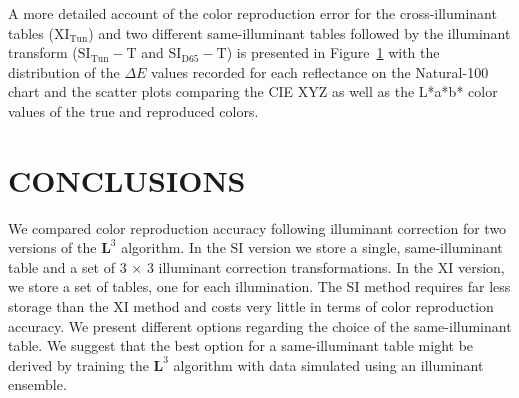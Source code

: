 \documentclass[]{spie}
\newcommand{\Lcube}{\boldsymbol L^3}
\newcommand{\XI}{\mathrm{XI}}
\newcommand{\SI}{\mathrm{SI}}
\newcommand{\XIT}{\mathrm{XI_{Tun}}}
\newcommand{\SITT}{\mathrm{SI_{Tun}-T}}
\newcommand{\SIDT}{\mathrm{SI_{D65}-T}}
\begin{document}
\begin{figure}[t]
\label{fig:colorStatisticsPlot}
\end{figure}

A more detailed account of the color reproduction error for the cross-illuminant tables ($\XIT$) and two different same-illuminant tables followed by the illuminant transform ($\SITT$ and $\SIDT$) is presented in Figure~\ref{fig:colorStatisticsPlot} with the distribution of the $\Delta E$ values recorded for each reflectance on the Natural-100 chart and the scatter plots comparing the CIE XYZ as well as the L*a*b* color values of the true and reproduced colors.

\section{CONCLUSIONS}

We compared color reproduction accuracy following illuminant correction for two versions of the $\Lcube$ algorithm. In the $\SI$ version we store a single, same-illuminant table and a set of 3 $\times$ 3 illuminant correction transformations. In the $\XI$ version, we store a set of tables, one for each illumination. The $\SI$ method requires far less storage than the $\XI$ method and costs very little in terms of color reproduction accuracy. We present different options regarding the choice of the same-illuminant table. We suggest that the best option for a same-illuminant table might be derived by training the $\Lcube$ algorithm with data simulated using an illuminant ensemble. 



\end{document}
